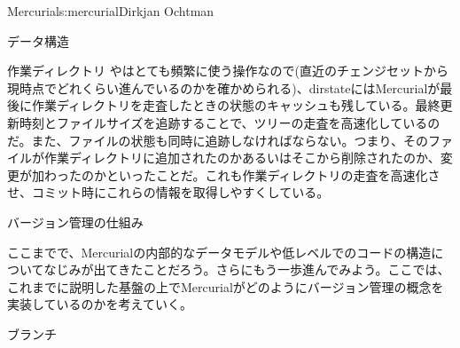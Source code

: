 \begin{aosachapter}{Mercurial}{s:mercurial}{Dirkjan Ochtman}
\begin{aosasect1}{データ構造}
\begin{aosasect2}{作業ディレクトリ}
やはとても頻繁に使う操作なので(直近のチェンジセットから現時点でどれくらい進んでいるのかを確かめられる)、dirstateにはMercurialが最後に作業ディレクトリを走査したときの状態のキャッシュも残している。最終更新時刻とファイルサイズを追跡することで、ツリーの走査を高速化しているのだ。また、ファイルの状態も同時に追跡しなければならない。つまり、そのファイルが作業ディレクトリに追加されたのかあるいはそこから削除されたのか、変更が加わったのかといったことだ。これも作業ディレクトリの走査を高速化させ、コミット時にこれらの情報を取得しやすくしている。

\end{aosasect2}

\end{aosasect1}

\begin{aosasect1}{バージョン管理の仕組み}

ここまでで、Mercurialの内部的なデータモデルや低レベルでのコードの構造についてなじみが出てきたことだろう。さらにもう一歩進んでみよう。ここでは、これまでに説明した基盤の上でMercurialがどのようにバージョン管理の概念を実装しているのかを考えていく。

\begin{aosasect2}{ブランチ}


\end{aosasect2}
\end{aosasect1}
\end{aosachapter}
